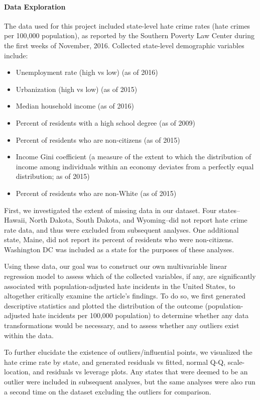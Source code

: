 \documentclass[
]{article}
\providecommand{\tightlist}{%
  \setlength{\itemsep}{0pt}\setlength{\parskip}{0pt}}
\begin{document}
\hypertarget{data-exploration}{%
\paragraph{Data Exploration}\label{data-exploration}}

The data used for this project included state-level hate crime rates
(hate crimes per 100,000 population), as reported by the Southern
Poverty Law Center during the first weeks of November, 2016. Collected
state-level demographic variables include:

\begin{itemize}
\tightlist
\item
  Unemployment rate (high vs low) (as of 2016)
\item
  Urbanization (high vs low) (as of 2015)
\item
  Median household income (as of 2016)
\item
  Percent of residents with a high school degree (as of 2009)
\item
  Percent of residents who are non-citizens (as of 2015)
\item
  Income Gini coefficient (a measure of the extent to which the
  distribution of income among individuals within an economy deviates
  from a perfectly equal distribution; as of 2015)
\item
  Percent of residents who are non-White (as of 2015)
\end{itemize}

First, we investigated the extent of missing data in our dataset. Four
states--Hawaii, North Dakota, South Dakota, and Wyoming--did not report
hate crime rate data, and thus were excluded from subsequent analyses.
One additional state, Maine, did not report its percent of residents who
were non-citizens. Washington DC was included as a state for the
purposes of these analyses.

Using these data, our goal was to construct our own multivariable linear
regression model to assess which of the collected variables, if any, are
significantly associated with population-adjusted hate incidents in the
United States, to altogether critically examine the article's findings.
To do so, we first generated descriptive statistics and plotted the
distribution of the outcome (population-adjusted hate incidents per
100,000 population) to determine whether any data transformations would
be necessary, and to assess whether any outliers exist within the data.

To further elucidate the existence of outliers/influential points, we
visualized the hate crime rate by state, and generated residuals vs
fitted, normal Q-Q, scale-location, and residuals vs leverage plots. Any
states that were deemed to be an outlier were included in subsequent
analyses, but the same analyses were also run a second time on the
dataset excluding the outliers for comparison.
\end{document}

